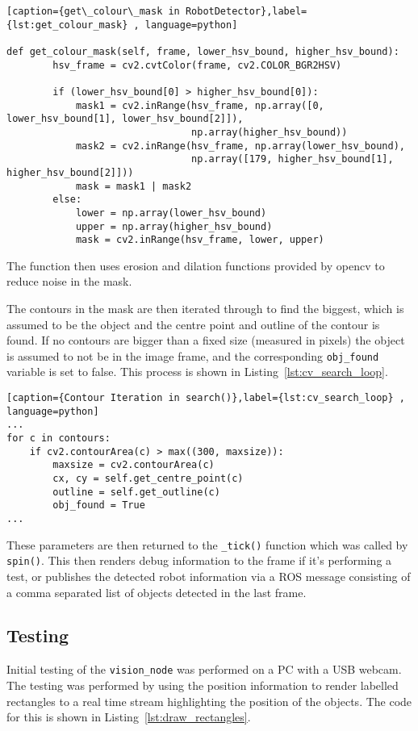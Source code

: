 \begin{lstlisting}[caption={get\_colour\_mask in RobotDetector},label={lst:get_colour_mask} , language=python]

def get_colour_mask(self, frame, lower_hsv_bound, higher_hsv_bound):
        hsv_frame = cv2.cvtColor(frame, cv2.COLOR_BGR2HSV)

        if (lower_hsv_bound[0] > higher_hsv_bound[0]):
            mask1 = cv2.inRange(hsv_frame, np.array([0, lower_hsv_bound[1], lower_hsv_bound[2]]),
                                np.array(higher_hsv_bound))
            mask2 = cv2.inRange(hsv_frame, np.array(lower_hsv_bound),
                                np.array([179, higher_hsv_bound[1], higher_hsv_bound[2]]))
            mask = mask1 | mask2
        else:
            lower = np.array(lower_hsv_bound)
            upper = np.array(higher_hsv_bound)
            mask = cv2.inRange(hsv_frame, lower, upper)

\end{lstlisting}

The function then uses erosion and dilation functions provided by opencv to reduce noise in the
mask.

The contours in the mask are then iterated through to find the biggest, which is assumed to be
the object and the centre point and outline of the contour is found. If no contours are bigger
than a fixed size (measured in pixels) the object is assumed to not be in the image frame, and
the corresponding \verb|obj_found| variable is set to false. This process is shown in Listing~\ref{lst:cv_search_loop}.

\begin{lstlisting}[caption={Contour Iteration in search()},label={lst:cv_search_loop} , language=python]
...
for c in contours:
    if cv2.contourArea(c) > max((300, maxsize)):
        maxsize = cv2.contourArea(c)
        cx, cy = self.get_centre_point(c)
        outline = self.get_outline(c)
        obj_found = True
...
\end{lstlisting}

These parameters are then returned to the \verb|_tick()| function which was called by
\verb|spin()|. This then renders debug information to the frame if it's performing a test, or
publishes the detected robot information via a ROS message consisting of a comma separated list of
objects detected in the last frame.

\subsection{Testing}\label{soft/cv/test}
Initial testing of the \verb|vision_node| was performed on a PC with a USB webcam. The
testing was performed by using the position information to render labelled rectangles to a real
time stream highlighting the position of the objects. The code for this is shown in Listing~\ref{lst:draw_rectangles}.

